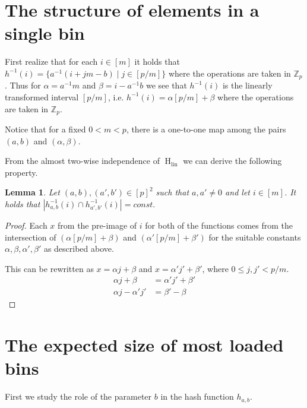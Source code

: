 \documentclass{article}
\newcommand{\hlin}{\operatorname{H}_{\operatorname{lin}}}
\newtheorem{lemma}{Lemma}
\begin{document}
\section{The structure of elements in a single bin}

First realize that for each $i \in [m]$ it holds that $h^{-1}(i) = \{a^{-1} (i + j m - b) \mid j \in [p / m]\}$ where the operations are taken in $\mathbb{Z}_p$.
Thus for $\alpha = a^{-1}m$ and $\beta = i-a^{-1}b$ we see that $h^{-1}(i)$ is the linearly transformed interval $[p / m]$, i.e. $h^{-1}(i) = \alpha [p/m] + \beta$ where the operations are taken in $\mathbb{Z}_p$.

Notice that for a fixed $0 < m < p$, there is a one-to-one map among the pairs $(a, b)$ and $(\alpha, \beta)$.

From the almost two-wise independence of $\hlin$ we can derive the following property. 
\begin{lemma}
Let $(a, b), (a', b') \in [p]^2$ such that $a, a' \neq 0$ and let $i \in [m]$. It holds that $|h_{a, b}^{-1}(i) \cap h_{a', b'}^{-1}(i)| = const.$
\end{lemma}
\begin{proof}
Each $x$ from the pre-image of $i$ for both of the functions comes from the intersection of $\left( \alpha [p/m] + \beta \right)$ and $\left(\alpha' [p/m] + \beta' \right)$ for the suitable constants $\alpha, \beta, \alpha', \beta'$ as described above.

This can be rewritten as $x = \alpha j + \beta$ and $x = \alpha' j' + \beta'$, where $0\leq j,j' < p/m$.
\begin{align*}
\alpha j + \beta & = \alpha' j' + \beta'\\
\alpha j - \alpha' j' & = \beta' - \beta
\end{align*}
\end{proof}

\section{The expected size of most loaded bins}

First we study the role of the parameter $b$ in the hash function $h_{a, b}$.
\end{document}
